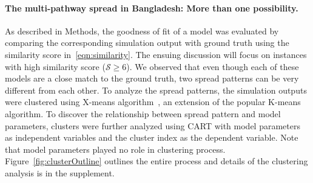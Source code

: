 \documentclass[11pt]{article}
\newcommand{\similarity}{\mathcal{S}}
\theoremstyle{definition}
\begin{document}
\paragraph{The multi-pathway spread in Bangladesh: More than one
possibility.} As described in Methods, the goodness of fit of a model was
evaluated by comparing the corresponding simulation output with ground
truth using the similarity score in~\eqref{eqn:similarity}. The ensuing
discussion will focus on instances with high similarity score
($\similarity\ge6$).  We observed that even though each of these models are
a close match to the ground truth, two spread patterns can be very
different from each other. To analyze the spread patterns, the simulation
outputs were clustered using X-means
algorithm~\cite{pelleg2000x,andrei_novikov_2018_1491324}, an extension of
the popular K-means algorithm. To discover the relationship between spread
pattern and model parameters, clusters were further analyzed using
CART with model parameters as independent variables and the cluster index
as the dependent variable. Note that model parameters played no role in
clustering process. Figure~\ref{fig:clusterOutline} outlines the
entire process and details of the clustering analysis is in the supplement.
\end{document}
